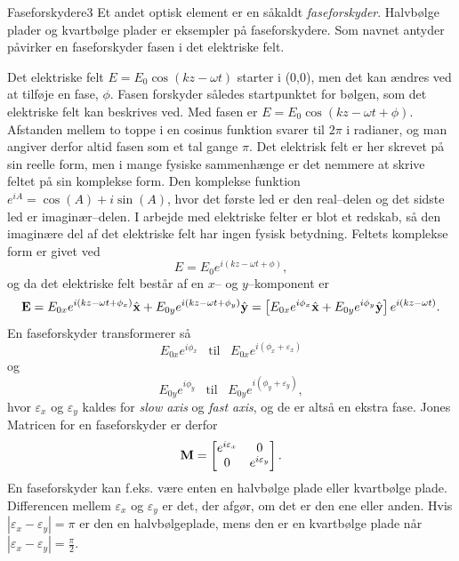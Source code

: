 \begin{opgave}{Faseforskydere}{3}
Et andet optisk element er en såkaldt \emph{faseforskyder}. Halvbølge plader og kvartbølge plader er eksempler på faseforskydere. Som navnet antyder påvirker en faseforskyder fasen i det elektriske felt. 

Det elektriske felt $E = E_0\cos(kz-\omega t)$ starter i (0,0), men det kan ændres ved at tilføje en fase, $\phi$. Fasen forskyder således startpunktet for bølgen, som det elektriske felt kan beskrives ved. Med fasen er $E = E_0\cos(kz-\omega t + \phi)$. Afstanden mellem to toppe i en cosinus funktion svarer til $2\pi$ i radianer, og man angiver derfor altid fasen som et tal gange $\pi$. Det elektrisk felt er her skrevet på sin reelle form, men i mange fysiske sammenhænge er det nemmere at skrive feltet på sin komplekse form. Den komplekse funktion $e^{iA} = \cos(A) + i\sin(A)$, hvor det første led er den real--delen og det sidste led er imaginær--delen. 
I arbejde med elektriske felter er blot et redskab, så den imaginære del af det elektriske felt har ingen fysisk betydning. Feltets komplekse form er givet ved 
\begin{equation}
E = E_0e^{i(kz - \omega t + \phi)}, 
\end{equation}
og da det elektriske felt består af en $x$-- og $y$--komponent er 
\begin{equation}
\mathbf{E} = E_{0x}e^{i(kz - \omega t + \phi_x)}\hat{\mathbf{x}} + E_{0y}e^{i(kz - \omega t + \phi_y)}\hat{\mathbf{y}} = \left[E_{0x}e^{i\phi_x}\hat{\mathbf{x}} + E_{0y}e^{i\phi_y}\hat{\mathbf{y}}\right]e^{i(kz-\omega t)}. 
\end{equation}
En faseforskyder transformerer så
\begin{equation}
E_{0x}e^{i\phi_x} \,\,\,\,\, \text{til} \,\,\,\,\, E_{0x}e^{i(\phi_x + \varepsilon_x)}
\end{equation}
og 
\begin{equation}
E_{0y}e^{i\phi_y} \,\,\,\,\, \text{til} \,\,\,\,\, E_{0y}e^{i(\phi_y + \varepsilon_y)},
\end{equation}
hvor $\varepsilon_x$ og $\varepsilon_y$ kaldes for \emph{slow axis} og \emph{fast axis}, og de er altså en ekstra fase. 
Jones Matricen for en faseforskyder er derfor 
\begin{equation}
\mathbf{M} = \begin{bmatrix}
e^{i\varepsilon_x} & 0 \\
0 & e^{i\varepsilon_y} \\
\end{bmatrix}.
\end{equation}
En faseforskyder kan f.eks. være enten en halvbølge plade eller kvartbølge plade. Differencen mellem $\varepsilon_x$ og $\varepsilon_y$ er det, der afgør, om det er den ene eller anden. Hvis $|\varepsilon_x-\varepsilon_y| = \pi$ er den en halvbølgeplade, mens den er en kvartbølge plade når $|\varepsilon_x-\varepsilon_y| = \frac{\pi}{2}$. 


\end{opgave}

